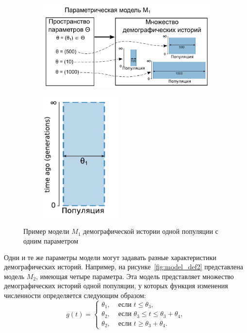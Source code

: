 \documentclass[a4paper,14pt,oneside,openany,article]{memoir}
\begin{document}
\begin{figure}[h]
    \centering
    \begin{subfigure}[b]{.59\textwidth}
    \includegraphics[width=\textwidth]{images_2/model_def.pdf}
    \caption{}
    \label{fig:model_def_1}
    \end{subfigure}%
    \begin{subfigure}[b]{.40\textwidth}
    \centering
    \includegraphics[width=0.45\textwidth]{images_2/model_pict.pdf}
    \caption{}
    \label{fig:model_def_2}
    \end{subfigure}
    \caption{Пример модели $M_1$ демографической истории одной популяции с одним параметром}
    \label{fig:model_def}
\end{figure}


Одни и те же параметры модели могут задавать разные характеристики демографических историй.
Например, на рисунке~\ref{fig:model_def2} представлена модель $M_2$, имеющая четыре параметра.
Эта модель представляет множество демографических историй одной популяции, у которых функция изменения численности определяется следующим образом:
$$
g(t) = 
\begin{cases}
    \theta_1, & \text{ если } t \leq \theta_3, \\
    \theta_2, & \text{ если } \theta_3 \leq t \leq \theta_3 + \theta_4, \\
    \theta_2, & \text{ если } t \geq \theta_3 + \theta_4.
\end{cases}
$$
\end{document}
